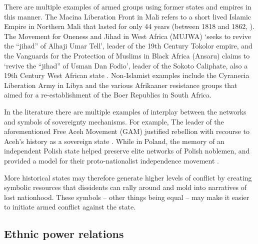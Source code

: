There are multiple examples of armed groups using former states and empires in
this manner. The Macina Liberation Front in Mali refers to a short lived Islamic
Empire in Northern Mali that lasted for only 44 years (between 1818 and 1862,
\citep{Brown1968}). The Movement for Oneness and Jihad in West Africa (MUJWA)
`seeks to revive the “jihad” of Alhaji Umar Tell', leader of the 19th Century
Tokolor empire, and the Vanguards for the Protection of Muslims in Black Africa
(Ansaru) claims to `revive the “jihad” of Usman Dan Fodio', leader of the Sokoto
Caliphate, also a 19th Century West African state \citep{Zenn2015}. Non-Islamist
examples include the Cyranecia Liberation Army in Libya and the various
Afrikaaner resistance groups that aimed for a re-establishment of the Boer
Republics in South Africa. 

In the literature there are multiple examples of interplay between the
networks and symbols of sovereignty mechanisms. For example, The leader of the
aforementioned Free Aceh Movement (GAM) justified rebellion with recourse to
Aceh's history as a sovereign state \citep{Aspinall2009}. While in Poland, the
memory of an independent Polish state helped preserve elite networks of Polish
noblemen, and provided a model for their proto-nationalist independence movement
\citep{Wimmer2018}.



More historical states may therefore generate higher levels of conflict by
creating symbolic resources that dissidents can rally around and mold into
narratives of lost nationhood. These symbols -- other things being equal -- may
make it easier to initiate armed conflict against the state.  


\subsection{Ethnic power relations}

